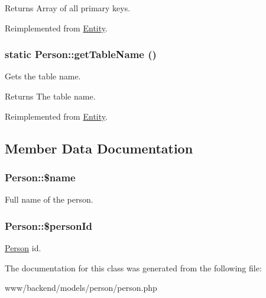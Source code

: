 \begin{DoxyReturn}{Returns}
Array of all primary keys. 
\end{DoxyReturn}


Reimplemented from \hyperlink{classEntity_a61bbfbb4058427174e002a09ddc77c41}{Entity}.

\hypertarget{classPerson_ab68a8aed417028b7755fb8c6c6fb2b62}{
\subsubsection[{getTableName}]{\setlength{\rightskip}{0pt plus 5cm}static Person::getTableName ()}}
\label{classPerson_ab68a8aed417028b7755fb8c6c6fb2b62}
Gets the table name.

\begin{DoxyReturn}{Returns}
The table name. 
\end{DoxyReturn}


Reimplemented from \hyperlink{classEntity_a8305fd94740ac62cbafb9de76567ce37}{Entity}.



\subsection{Member Data Documentation}
\hypertarget{classPerson_a311265986bee974f2812463c8e580887}{
\subsubsection[{\$name}]{\setlength{\rightskip}{0pt plus 5cm}Person::\$name}}
\label{classPerson_a311265986bee974f2812463c8e580887}
Full name of the person. \hypertarget{classPerson_aba3277526264a137afc631ec81e53810}{
\subsubsection[{\$personId}]{\setlength{\rightskip}{0pt plus 5cm}Person::\$personId}}
\label{classPerson_aba3277526264a137afc631ec81e53810}
\hyperlink{classPerson}{Person} id. 

The documentation for this class was generated from the following file:\begin{DoxyCompactItemize}
\item 
www/backend/models/person/person.php\end{DoxyCompactItemize}
